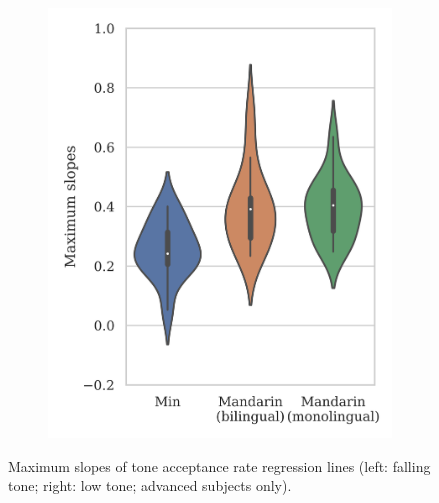\begin{figure}[hbt!]
\begin{subfigure}[b]{.49\textwidth}
\includegraphics[width=\textwidth]{figures/E3/Result_21_advanced.png}
\end{subfigure}

\caption{Maximum slopes of tone acceptance rate regression lines (left: falling tone; right: low tone; advanced subjects only).}
\label{Figure:E3BoxPlot}
\end{figure}

%

